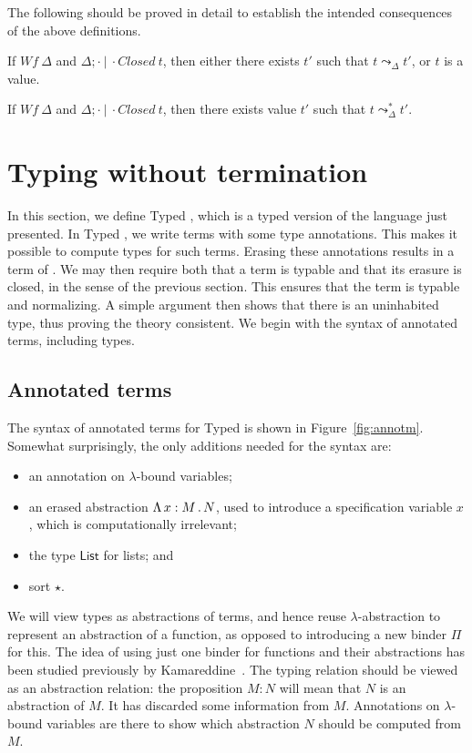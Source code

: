\documentclass{article}
\begin{document}
The following should be proved in detail to establish the intended consequences of the above definitions.

\begin{proposition}[Safety]
  If $\textit{Wf}\ \Delta$ and $\Delta;\cdot\ |\ \cdot \textit{Closed}\ t$,
  then either there exists $t'$ such that $t \leadsto_\Delta t'$, or
  $t$ is a value.
\end{proposition}

\begin{proposition}[Normalization]
  If $\textit{Wf}\ \Delta$ and $\Delta;\cdot\ |\ \cdot \textit{Closed}\ t$,
  then there exists value $t'$ such that $t \leadsto_\Delta^* t'$.
\end{proposition}

\section{Typing without termination}

In this section, we define Typed \sar, which is a typed version of the
\sar language just presented.  In Typed \sar, we write terms with some
type annotations.  This makes it possible to compute types for such terms.
Erasing these annotations results in a term of \sar.  We may then require
both that a term is typable and that its erasure is closed, in the sense
of the previous section.  This ensures that the term is typable and
normalizing.  A simple argument then shows that there is an uninhabited
type, thus proving the theory consistent.  We begin with the syntax
of annotated terms, including types.

\subsection{Annotated terms}

The syntax of annotated terms for Typed \sar is shown in Figure~\ref{fig:annotm}.  Somewhat
surprisingly, the only additions needed for the syntax are:
\begin{itemize}
\item an annotation on $\lambda$-bound variables;
\item an erased abstraction $\Lambda\, x : M\, .\, N$, used to introduce a specification variable $x$, which
  is computationally irrelevant; 
\item the type $\mathsf{List}$ for lists; and
\item sort $\star$.
\end{itemize}
\noindent We will view types as abstractions of terms, and hence
reuse $\lambda$-abstraction to represent an abstraction of a function, as opposed
to introducing a new binder $\Pi$ for this.  The idea of using just one binder
for functions and their abstractions has been
studied previously by Kamareddine~\cite{kamareddine05}.  The typing relation
should be viewed as an abstraction relation: the proposition $M : N$ will mean that
$N$ is an abstraction of $M$.  It has discarded some information from $M$.  Annotations
on $\lambda$-bound variables are there to show which abstraction $N$ should be computed from $M$.
\end{document}
